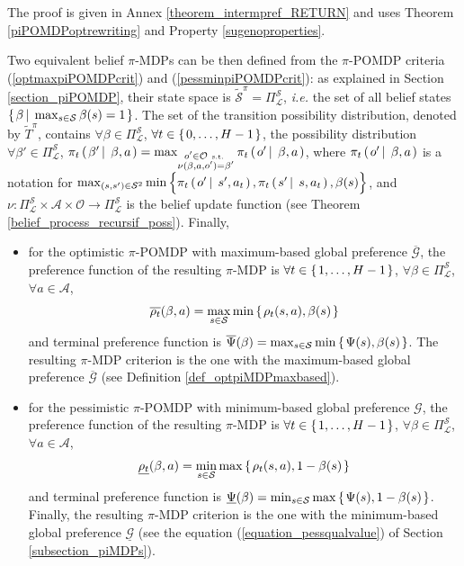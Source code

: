 The proof is given in Annex \ref{theorem_intermpref_RETURN} 
and uses Theorem \ref{piPOMDPoptrewriting} and Property \ref{sugenoproperties}.

Two equivalent belief $\pi$-MDPs can be then defined 
from the $\pi$-POMDP criteria (\ref{optmaxpiPOMDPcrit}) and (\ref{pessminpiPOMDPcrit}):
as explained in Section \ref{section_piPOMDP},
their state space is $\tilde{\mathcal{S}}^{\pi}=\Pi^{\mathcal{S}}_{\mathcal{L}}$,
\textit{i.e.} the set of all belief states $\left\{ \left.  \beta \, \right| \left. \, \max_{s \in \mathcal{S}}\beta(s)=1  \right. \right\}$. The set of the transition possibility distribution, denoted by $\tilde{T}^{\pi}$,
contains $\forall \beta \in \Pi^{\mathcal{S}}_{\mathcal{L}}$, $\forall t \in \left\{ \left. 0,\ldots,H-1 \right. \right\}$,
the possibility distribution $\forall \beta' \in \Pi^{\mathcal{S}}_{\mathcal{L}}$,
$\pi_t \left( \left.  \beta' \, \right| \left. \, \beta,a \right. \right) = \max_{ \substack{ o' \in \mathcal{O} \mbox{ \tiny s.t. } \\ \nu(\beta,a,o') = \beta'} } \pi_t \left( \left.  o' \, \right| \left. \, \beta, a  \right. \right)$,
where $\pi_t \left( \left.  o' \, \right| \left. \, \beta, a  \right. \right)$ is a notation for $\max_{(s,s') \in \mathcal{S}^2} \min \Big\{ \pi_t \left( \left.  o' \, \right| \left. \, s', a_t  \right. \right), \pi_t \left( \left.  s' \, \right| \left. \, s, a_t  \right. \right), \beta(s) \Big\}$, and $\nu: \Pi^{\mathcal{S}}_{\mathcal{L}} \times \mathcal{A} \times \mathcal{O} \rightarrow \Pi^{\mathcal{S}}_{\mathcal{L}}$ is the belief update function (see Theorem \ref{belief_process_recursif_poss}).
Finally, 
\begin{itemize}
\item for the optimistic $\pi$-POMDP with maximum-based global preference $\overline{\mathcal{G}}$,
the preference function of the resulting $\pi$-MDP is $\forall t \in \left\{ \left. 1,\ldots,H-1 \right. \right\}$, 
$\forall \beta \in \Pi^{\mathcal{S}}_{\mathcal{L}}$, $\forall a \in \mathcal{A}$,
\[ \overline{\rho_t}(\beta,a) = \max_{s \in \mathcal{S}} \min \left\{ \left.  \rho_t(s,a), \beta(s)  \right. \right\} \]
and terminal preference function is
$\overline{\Psi}(\beta) = \max_{s \in \mathcal{S}} \min \left\{ \left.  \Psi(s), \beta(s)  \right. \right\}$.
The resulting $\pi$-MDP criterion is the one with the maximum-based global preference $\overline{\mathcal{G}}$ (see Definition \ref{def_optpiMDPmaxbased}).
\item for the pessimistic $\pi$-POMDP with minimum-based global preference $\mathcal{G}$,
the preference function of the resulting $\pi$-MDP  is
$\forall t \in \left\{ \left. 1,\ldots,H-1 \right. \right\}$, 
$\forall \beta \in \Pi^{\mathcal{S}}_{\mathcal{L}}$, $\forall a \in \mathcal{A}$,
\[ \underline{\rho_t}(\beta,a) = \min_{s \in \mathcal{S}} \max \left\{ \left.  \rho_t(s,a), 1 - \beta(s)  \right. \right\} \]
and terminal preference function is
$\underline{\Psi}(\beta) = \min_{s \in \mathcal{S}} \max \left\{ \left.  \Psi(s), 1 - \beta(s)  \right. \right\}$.
Finally, the resulting $\pi$-MDP criterion
is the one with the minimum-based global preference $\underline{\mathcal{G}}$ 
(see the equation (\ref{equation_pessqualvalue})
of Section \ref{subsection_piMDPs}).
\end{itemize}

